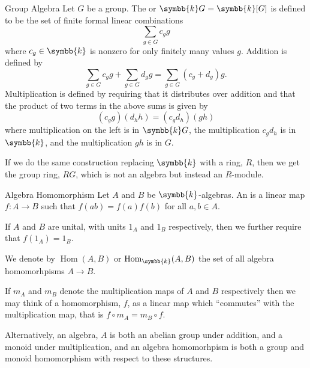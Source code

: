 \documentclass[fleqn]{NotesClass}
\renewcommand{\field}{\symbb{k}}
\DeclareMathOperator{\Hom}{Hom}
\begin{document}
    \begin{dfn}{Group Algebra}{}
        Let \(G\) be a group.
        The  or  \(\field G = \field[G]\) is defined to be the set of finite formal linear combinations
        \begin{equation}
            \sum_{g \in G} c_g g
        \end{equation}    
        where \(c_g \in \field\) is nonzero for only finitely many values \(g\).
        Addition is defined by
        \begin{equation}
            \sum_{g \in G} c_g g + \sum_{g \in G} d_g g = \sum_{g \in G} (c_g + d_g) g.
        \end{equation}
        Multiplication is defined by requiring that it distributes over addition and that the product of two terms in the above sums is given by
        \begin{equation}
            (c_g g) (d_h h) = (c_g d_h) (gh)
        \end{equation}
        where multiplication on the left is in \(\field G\), the multiplication \(c_g d_h\) is in \(\field\), and the multiplication \(gh\) is in \(G\).
        
        If we do the same construction replacing \(\field\) with a ring, \(R\), then we get the group ring, \(RG\), which is not an algebra but instead an \(R\)-module.
    \end{dfn}
    
    \begin{dfn}{Algebra Homomorphism}{}
        Let \(A\) and \(B\) be \(\field\)-algebras.
        An  is a linear map \(f \colon A \to B\) such that \(f(ab) = f(a)f(b)\) for all \(a, b \in A\).
        
        If \(A\) and \(B\) are unital, with units \(1_A\) and \(1_B\) respectively, then we further require that \(f(1_A) = 1_B\).
        
        We denote by \(\Hom(A, B)\) or \(\Hom_{\field}(A, B)\) the set of all algebra homomorhpisms \(A \to B\).
    \end{dfn}
    
    If \(m_A\) and \(m_B\) denote the multiplication maps of \(A\) and \(B\) respectively then we may think of a homomorphism, \(f\), as a linear map which \enquote{commutes} with the multiplication map, that is \(f \circ m_A = m_B \circ f\).
    
    Alternatively, an algebra, \(A\) is both an abelian group under addition, and a monoid under multiplication, and an algebra homomorhpism is both a group and monoid homomorphism with respect to these structures.
    
\end{document}
